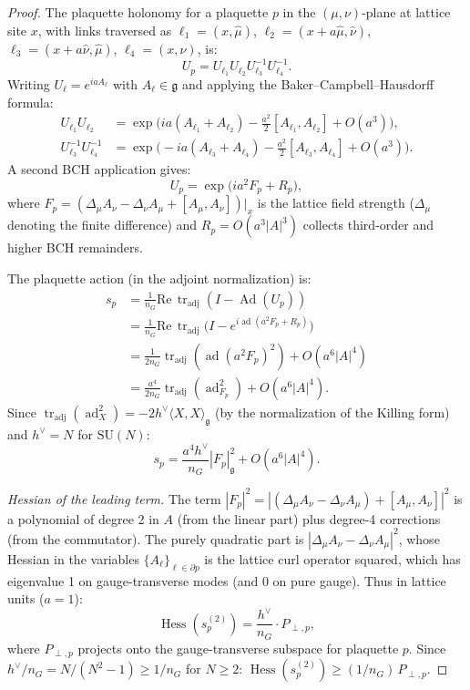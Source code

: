 \documentclass[11pt,a4paper]{article}
\theoremstyle{plain}
\theoremstyle{definition}
\theoremstyle{remark}
\newcommand{\tr}{\operatorname{tr}}
\newcommand{\ad}{\operatorname{ad}}
\newcommand{\Ad}{\operatorname{Ad}}
\newcommand{\Hess}{\operatorname{Hess}}
\newcommand{\SU}{\mathrm{SU}}
\newcommand{\fg}{\mathfrak{g}}
\begin{document}
\begin{proof}
The plaquette holonomy for a plaquette $p$ in the
$(\mu,\nu)$-plane at lattice site $x$, with links
traversed as $\ell_1 = (x,\hat\mu)$,
$\ell_2 = (x+a\hat\mu,\hat\nu)$,
$\ell_3 = (x+a\hat\nu,\hat\mu)$,
$\ell_4 = (x,\hat\nu)$, is:
\begin{equation}
  U_p = U_{\ell_1}U_{\ell_2}U_{\ell_3}^{-1}U_{\ell_4}^{-1}.
\end{equation}
Writing $U_\ell = e^{iaA_\ell}$ with $A_\ell \in \fg$
and applying the Baker--Campbell--Hausdorff formula:
\begin{align}
  U_{\ell_1}U_{\ell_2} &= \exp\!\bigl(
  ia(A_{\ell_1} + A_{\ell_2})
  - \tfrac{a^2}{2}[A_{\ell_1}, A_{\ell_2}]
  + O(a^3)\bigr), \\
  U_{\ell_3}^{-1}U_{\ell_4}^{-1} &= \exp\!\bigl(
  -ia(A_{\ell_3} + A_{\ell_4})
  - \tfrac{a^2}{2}[A_{\ell_3}, A_{\ell_4}]
  + O(a^3)\bigr).
\end{align}
A second BCH application gives:
\begin{equation}\label{eq:bch_detail}
  U_p = \exp\!\bigl(ia^2 F_p + R_p\bigr),
\end{equation}
where $F_p = (\Delta_\mu A_\nu - \Delta_\nu A_\mu
+ [A_\mu, A_\nu])|_x$ is the lattice field strength
($\Delta_\mu$ denoting the finite difference) and
$R_p = O(a^3 |A|^3)$ collects third-order and higher
BCH remainders.

The plaquette action (in the adjoint normalization) is:
\begin{align}
  s_p &= \frac{1}{n_G}\mathrm{Re}\,\tr_{\mathrm{adj}}
  (I - \Ad(U_p)) \nonumber\\
  &= \frac{1}{n_G}\mathrm{Re}\,\tr_{\mathrm{adj}}
  \bigl(I - e^{i\ad(a^2 F_p + R_p)}\bigr) \nonumber\\
  &= \frac{1}{2n_G}\tr_{\mathrm{adj}}
  (\ad(a^2 F_p)^2) + O(a^6|A|^4) \nonumber\\
  &= \frac{a^4}{2n_G}\tr_{\mathrm{adj}}(\ad_{F_p}^2)
  + O(a^6|A|^4). \label{eq:sp_expand}
\end{align}
Since $\tr_{\mathrm{adj}}(\ad_X^2) = -2h^\vee
\langle X, X\rangle_\fg$ (by the normalization of
the Killing form) and $h^\vee = N$ for $\SU(N)$:
\begin{equation}
  s_p = \frac{a^4 h^\vee}{n_G}|F_p|^2_\fg
  + O(a^6|A|^4).
\end{equation}

\emph{Hessian of the leading term.}
The term $|F_p|^2 = |(\Delta_\mu A_\nu - \Delta_\nu A_\mu)
+ [A_\mu, A_\nu]|^2$ is a polynomial of degree 2 in
$A$ (from the linear part) plus degree-4 corrections
(from the commutator). The purely quadratic part is
$|\Delta_\mu A_\nu - \Delta_\nu A_\mu|^2$, whose
Hessian in the variables $\{A_\ell\}_{\ell \in \partial p}$
is the lattice curl operator squared, which has
eigenvalue 1 on gauge-transverse modes (and 0 on
pure gauge). Thus in lattice units ($a = 1$):
\begin{equation}
  \Hess(s_p^{(2)}) = \frac{h^\vee}{n_G}
  \cdot P_{\perp,p},
\end{equation}
where $P_{\perp,p}$ projects onto the gauge-transverse
subspace for plaquette $p$. Since $h^\vee/n_G
= N/(N^2-1) \ge 1/n_G$ for $N \ge 2$:
$\Hess(s_p^{(2)}) \ge (1/n_G)\,P_{\perp,p}$.


\end{proof}
\end{document}

